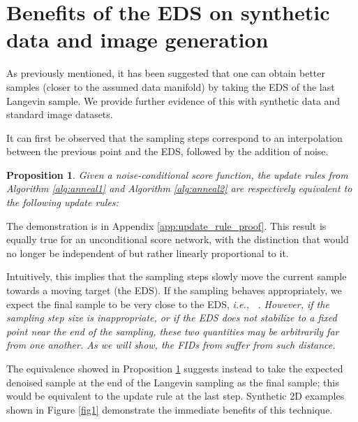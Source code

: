 \documentclass{article} \usepackage{iclr2021_conference_notitle,times}
\theoremstyle{definition}
\theoremstyle{definition}
\newtheorem{proposition}{Proposition}
\begin{document}
\section{Benefits of the EDS on synthetic data and image generation }\label{sec:sampling_improvements}

As previously mentioned, it has been suggested that one can obtain better samples (closer to the assumed data manifold) by taking the EDS of the last Langevin sample. We provide further evidence of this with synthetic data and standard image datasets. 

It can first be observed that the sampling steps correspond to an interpolation between the previous point and the EDS, followed by the addition of noise.

\begin{proposition}\label{prop:interp}
\em Given a noise-conditional score function, the update rules from Algorithm \ref{alg:anneal1} and Algorithm \ref{alg:anneal2} are respectively equivalent to the following update rules: \em 

\end{proposition}

The demonstration is in Appendix \ref{app:update_rule_proof}. This result is equally true for an unconditional score network, with the distinction that  would no longer be independent of  but rather linearly proportional to it.

Intuitively, this implies that the sampling steps slowly move the current sample towards a moving target (the EDS). If the sampling behaves appropriately, we expect the final sample  to be very close to the EDS, \em i.e.,\em ~  . However, if the sampling step size is inappropriate, or if the EDS does not stabilize to a fixed point near the end of the sampling, these two quantities may be arbitrarily far from one another. As we will show, the FIDs from \citet{song2020improved} suffer from such  distance. 

The equivalence showed in Proposition \ref{prop:interp} suggests instead to take the expected denoised sample at the end of the Langevin sampling as the final sample; this would be equivalent to the update rule
 at the last step. Synthetic 2D examples shown in Figure \ref{fig1} demonstrate the immediate benefits of this technique.
\end{document}

